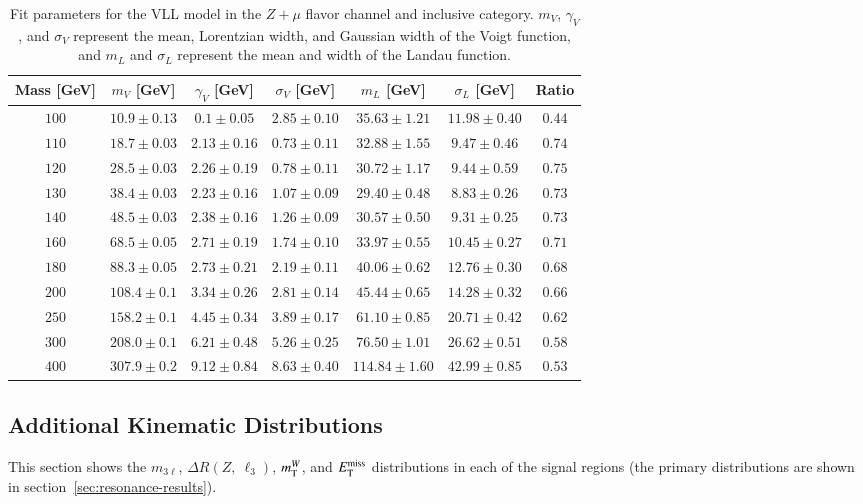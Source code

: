 \begin{appendices}
\begin{table}[h]
 \centering
\scriptsize
\begin{tabular}{|c||c|c|c|c|c|c|} 
 \hline\hline
Mass [GeV] & $m_V$ [GeV] &  $\gamma_V$ [GeV] &  $\sigma_V$ [GeV] & $m_L$  [GeV] & $\sigma_L$ [GeV] & Ratio\\
\hline \hline
$100$&$10.9\pm0.13 $&$ 0.1\pm0.05 $&$ 2.85\pm0.10 $&$ 35.63\pm1.21 $&$ 11.98\pm0.40$&$0.44$\\
$110$&$18.7\pm0.03$&$ 2.13\pm0.16 $&$ 0.73\pm0.11 $&$ 32.88\pm1.55 $&$ 9.47\pm0.46$&$0.74$\\
$120$&$28.5\pm0.03 $&$ 2.26\pm0.19 $&$ 0.78\pm0.11 $&$ 30.72\pm1.17 $&$ 9.44\pm0.59$&$0.75$\\
$130$&$38.4\pm0.03 $&$ 2.23\pm0.16 $&$ 1.07\pm0.09 $&$ 29.40\pm0.48 $&$ 8.83\pm0.26$&$0.73$\\
$140$&$48.5\pm0.03$&$ 2.38\pm0.16 $&$ 1.26\pm0.09 $&$ 30.57\pm0.50 $&$ 9.31\pm0.25$&$0.73$\\
$160$&$68.5\pm0.05 $&$ 2.71\pm0.19 $&$ 1.74\pm0.10 $&$ 33.97\pm0.55 $&$ 10.45\pm0.27$&$0.71$\\
$180$&$88.3\pm0.05 $&$ 2.73\pm0.21 $&$ 2.19\pm0.11 $&$ 40.06\pm0.62 $&$ 12.76\pm0.30$&$0.68$\\
$200$&$108.4\pm0.1 $&$ 3.34\pm0.26 $&$ 2.81\pm0.14 $&$ 45.44\pm0.65 $&$ 14.28\pm0.32$&$0.66$\\
$250$&$158.2\pm0.1 $&$ 4.45\pm0.34 $&$ 3.89\pm0.17 $&$ 61.10\pm0.85 $&$ 20.71\pm0.42$&$0.62$\\
$300$&$208.0\pm0.1 $&$ 6.21\pm0.48 $&$ 5.26\pm0.25 $&$ 76.50\pm1.01 $&$ 26.62\pm0.51$&$0.58$\\
$400$&$307.9\pm0.2 $&$ 9.12\pm0.84 $&$ 8.63\pm0.40 $&$ 114.84\pm1.60 $&$ 42.99\pm0.85$&$0.53$\\
\hline\hline
\end{tabular} 
\caption{Fit parameters for the VLL model in the $Z+\mu$ flavor channel and inclusive category. $m_V$, $\gamma_V$, and $\sigma_V$ represent the mean, Lorentzian width, and Gaussian width of the Voigt function, and $m_L$ and $\sigma_L$ represent the mean and width of the Landau function.}
   \label{table:ZmuFitParamsVLL}
\end{table}



\subsection{Additional Kinematic Distributions}\label{sec:appendix-resonance-SR-distributions}
This section shows the $m_{3\ell}$, $\Delta R(Z,\ \ell_3)$, $m_{\mathrm{T}}^W$, and $E_{\text{T}}^{\text{miss}}$ distributions in each of the signal regions (the primary distributions are shown in section~\ref{sec:resonance-results}).


\end{appendices}
